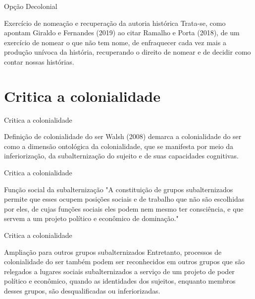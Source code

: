 \documentclass[12pt]{beamer}
\begin{document}
		\begin{frame}{Opção Decolonial}
			\begin{block}{Exercício de nomeação e recuperação da autoria histórica}
				\justifying
				Trata-se, como apontam Giraldo e Fernandes (2019) ao citar Ramalho e Porta (2018), de um exercício de nomear o que não tem nome, de enfraquecer cada vez mais a produção unívoca da história, recuperando o direito de nomear e de decidir como contar nossas histórias.
			\end{block}
		\end{frame}
	

	\section{Critica a colonialidade}
	
		\begin{frame}{Critica a colonialidade}
			\begin{block}{Definição de colonialidade do ser}
				\justifying
				Walsh (2008) demarca a colonialidade do ser como a dimensão ontológica da colonialidade, que se manifesta por meio da inferiorização, da subalternização do sujeito e de suas capacidades cognitivas.
			\end{block}
		\end{frame}
		
		
		\begin{frame}{Critica a colonialidade}
			\begin{block}{Função social da subalternização}
				\justifying
				"A constituição de grupos subalternizados permite que esses ocupem posições sociais e de trabalho que não são escolhidas por eles, de cujas funções sociais eles podem nem mesmo ter consciência, e que servem a um projeto político e econômico de dominação."
			\end{block}
		\end{frame}
		
		\begin{frame}{Critica a colonialidade}
			\begin{block}{Ampliação para outros grupos subalternizados}
				\justifying
				Entretanto, processos de colonialidade do ser também podem ser reconhecidos em outros grupos que são relegados a lugares sociais subalternizados a serviço de um projeto de poder político e econômico, quando as identidades dos sujeitos, enquanto membros desses grupos, são desqualificadas ou inferiorizadas.
			\end{block}
		\end{frame}
	
\end{document}
